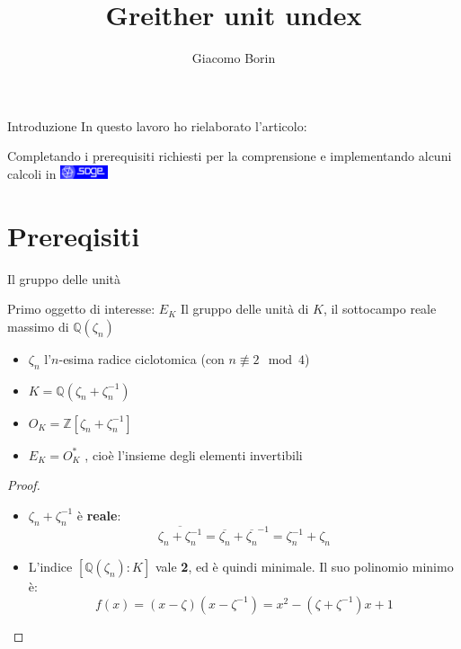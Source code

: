 \documentclass{beamer}
\title{Greither unit undex}
\author{Giacomo Borin}
\institute{Università di Trento}
\theoremstyle{plain}
\theoremstyle{remark}
\theoremstyle{definition}
\newcommand{\noqed}{\let\qed\relax}
\newcommand{\Z}{\mathbb{Z}}
\newcommand{\Q}{\mathbb{Q}}
\begin{document}
	\begin{frame}[plain]
	    \maketitle
	\end{frame}
	
	\begin{frame}{Introduzione}
		In questo lavoro ho rielaborato l'articolo: 
		\pause
		\begin{exampleblock}{}
		\end{exampleblock}	
		\pause
		Completando i prerequisiti richiesti per la comprensione e implementando alcuni calcoli in \href{https://www.sagemath.org}{\includegraphics[height= 11pt]{../images/sage.png} }
		
	\end{frame}
	\section{Prereqisiti}

	\begin{frame}{Il gruppo delle unità}
		\begin{block}{Primo oggetto di interesse: $ E_K $}
			Il gruppo delle unità di $ K $, il sottocampo reale massimo di $ \Q (\zeta_n )  $
		\end{block}
		\pause
		\begin{itemize}
			\item $ \zeta_n $  l'$ n $-esima radice ciclotomica (con $ n \not \equiv 2 \mod 4 $) \pause
			\item $ K = \Q (\zeta_n + \zeta_n^{-1})$ \pause
			\item $ O_K = \Z[\zeta_n + \zeta_n^{-1}] $ \pause
			\item $ E_K = O _K ^\ast$ , cioè l'insieme degli elementi invertibili 
		\end{itemize}
	\end{frame}
	
	\begin{frame}
		\begin{proof} \noqed
			\begin{itemize}
			\item $  \zeta_n + \zeta_n^{-1}  $ è \textbf{reale}:
			\[ \overline{\zeta_n + \zeta_n^{-1}} = \overline{\zeta_n} + \overline{\zeta_n}^{-1} = \zeta_n^{-1} + \zeta_n \] \pause
			\item L'indice $ [\Q(\zeta_n) : K] $ vale \textbf{2}, ed è quindi minimale. \pause 
			Il suo polinomio minimo è: 
			\[ f(x) = (x-\zeta)(x- \zeta^{-1}) = x^2 - (\zeta + \zeta ^{-1})x +1   \]
			\end{itemize}
		\end{proof}
	\end{frame}
	
\end{document}
